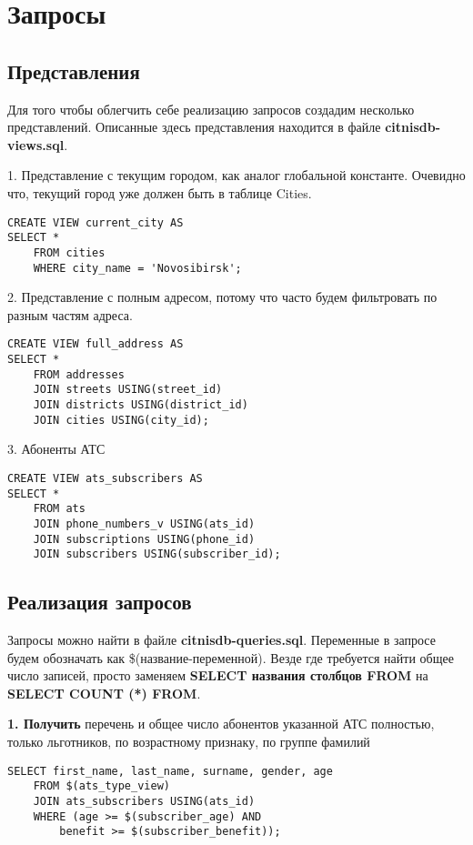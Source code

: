 \documentclass{report}
\begin{document}
\chapter{Запросы}

\section{Представления}

Для того чтобы облегчить себе реализацию запросов создадим несколько
представлений. Описанные здесь представления находится в файле 
\textbf{citnisdb-views.sql}.

1. Представление с текущим городом, как аналог глобальной константе.
Очевидно что, текущий город уже должен быть в таблице Cities.

\begin{lstlisting}
CREATE VIEW current_city AS
SELECT *
    FROM cities 
    WHERE city_name = 'Novosibirsk'; 
\end{lstlisting}

2. Представление с полным адресом, потому что часто будем фильтровать
по разным частям адреса.

\begin{lstlisting}
CREATE VIEW full_address AS
SELECT *
    FROM addresses 
    JOIN streets USING(street_id)
    JOIN districts USING(district_id)
    JOIN cities USING(city_id);
\end{lstlisting}

3. Абоненты АТС
\begin{lstlisting}
CREATE VIEW ats_subscribers AS
SELECT *
    FROM ats
    JOIN phone_numbers_v USING(ats_id)
    JOIN subscriptions USING(phone_id)
    JOIN subscribers USING(subscriber_id);
\end{lstlisting}

\section{Реализация запросов}

Запросы можно найти в файле \textbf{citnisdb-queries.sql}.
Переменные в запросе будем обозначать как \$(название-переменной). 
Везде где требуется найти общее число записей, просто заменяем
\textbf{SELECT названия столбцов FROM} на 
\textbf{SELECT COUNT (*) FROM}.

\textbf{1. Получить} перечень и общее число абонентов указанной АТС полностью, 
только льготников, по возрастному признаку, по группе фамилий

\begin{lstlisting}
SELECT first_name, last_name, surname, gender, age 
    FROM $(ats_type_view) 
    JOIN ats_subscribers USING(ats_id)
    WHERE (age >= $(subscriber_age) AND
        benefit >= $(subscriber_benefit));
\end{lstlisting}
\end{document}

